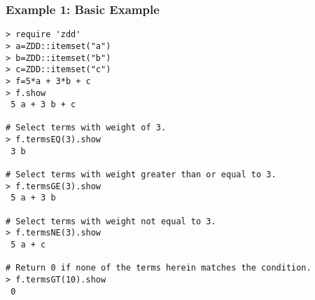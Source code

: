 \subsubsection*{Example 1: Basic Example}



\begin{Verbatim}[baselinestretch=0.7,frame=single]
> require 'zdd'
> a=ZDD::itemset("a")
> b=ZDD::itemset("b")
> c=ZDD::itemset("c")
> f=5*a + 3*b + c
> f.show
 5 a + 3 b + c

# Select terms with weight of 3. 
> f.termsEQ(3).show
 3 b

# Select terms with weight greater than or equal to 3.
> f.termsGE(3).show
 5 a + 3 b

# Select terms with weight not equal to 3.
> f.termsNE(3).show
 5 a + c

# Return 0 if none of the terms herein matches the condition. 
> f.termsGT(10).show
 0
\end{Verbatim}
